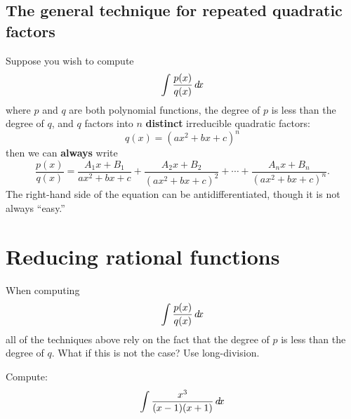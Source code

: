 \documentclass{ximera}
\begin{document}
\subsection{The general technique for repeated quadratic factors}
Suppose you wish to compute
\[
\int \frac{p(x)}{q(x)} \mathop{}\!d\! x
\]
where $p$ and $q$ are both polynomial functions, the degree of $p$ is
less than the degree of $q$, and $q$ factors into $n$
\textbf{distinct} irreducible quadratic factors:
\[
q(x) = (ax^2 + b x + c)^n 
\]
then we can \textbf{always} write
\[
\frac{p(x)}{q(x)}  = \frac{A_1x+B_1}{ax^2 + bx + c} + \frac{A_2x+B_2}{(ax^2 + bx + c)^2} + \cdots + \frac{A_nx+B_n}{(ax^2 + b x + c)^n}. 
\]
The right-hand side of the equation can be antidifferentiated, though it is not always ``easy.''


\section{Reducing rational functions}

When computing
\[
\int \frac{p(x)}{q(x)} \mathop{}\!d\! x
\]
all of the techniques above rely on the fact that the degree of $p$ is
less than the degree of $q$. What if this is not the case? Use
long-division.

\begin{example}
  Compute:
  \[
  \int \frac{x^3}{(x-1)(x+1)} \mathop{}\!d\! x
  \]
  \begin{explanation}
    \begin{center}%
    \end{center}
  \end{explanation}
\end{example}
    
\end{document}
